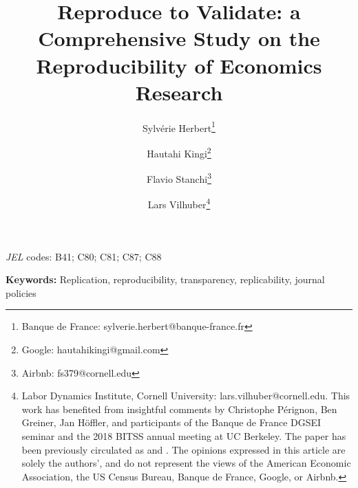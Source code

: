 \documentclass[utf8]{article}
\newcommand{\mytitle}{Reproduce to Validate: a Comprehensive Study on the Reproducibility of Economics Research}
\newcommand{\myauthorA}{Hautahi Kingi}
\newcommand{\myauthorB}{Flavio Stanchi}
\newcommand{\myauthorC}{Lars Vilhuber}
\newcommand{\myauthorD}{Sylv\'erie Herbert}
\begin{document}



\renewcommand{\ROutputs}{analysis}

\title{\mytitle}
\author{\myauthorD\thanks{Banque de France: sylverie.herbert@banque-france.fr} \and \myauthorA\thanks{Google: hautahikingi@gmail.com} \and \myauthorB\thanks{Airbnb: fs379@cornell.edu} \and \myauthorC \thanks{Labor Dynamics Institute, Cornell University: lars.vilhuber@cornell.edu. This work has benefited from insightful comments by Christophe P\'erignon, Ben Greiner, Jan H\"offler, and participants of the Banque de France DGSEI seminar and the 2018 BITSS annual meeting at UC Berkeley. The paper has been previously circulated as \citet{kingi2018} and \citet{herbert2021}.  The opinions expressed in this article are solely the authors', and do not represent the views of the American Economic Association, the US Census Bureau, Banque de France, Google, or Airbnb. }}

\maketitle
\sloppy

\begin{abstract}




\end{abstract}

\textit{JEL} codes: B41; C80; C81; C87; C88


\textbf{Keywords:} Replication, reproducibility, transparency, replicability, journal policies\\


\thispagestyle{empty}

\onehalfspacing
\clearpage


\clearpage

\end{document}

